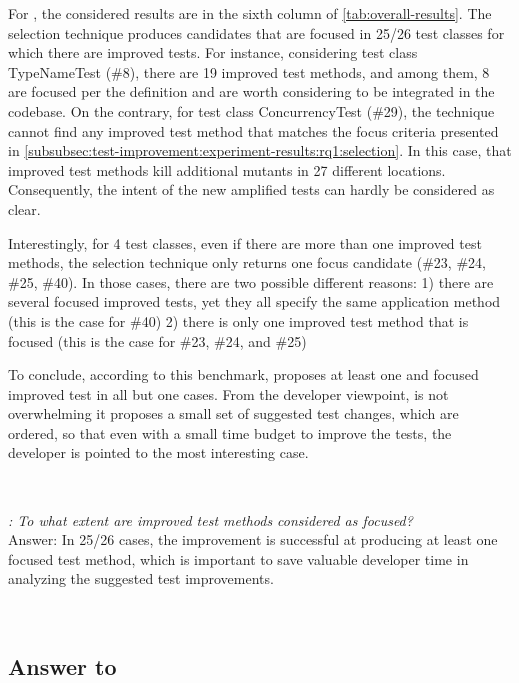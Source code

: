 For \rqcandidates{}, the considered results are in the sixth column of \autoref{tab:overall-results}.
The selection technique produces candidates that are focused in 25/26 test classes for which there are improved tests.
For instance, considering test class TypeNameTest (\#8), there are 19 improved test methods, and among them, 8 are focused per the definition and are worth considering to be integrated in the codebase.
On the contrary, for test class ConcurrencyTest (\#29), the technique cannot find any improved test method that matches the focus criteria presented in \autoref{subsubsec:test-improvement:experiment-results:rq1:selection}. 
In this case, that improved test methods kill additional mutants in 27 different locations. 
Consequently, the intent of the new amplified tests can  hardly be considered as clear.

Interestingly, for 4 test classes, even if there are more than one improved test methods, the selection technique only returns one focus candidate (\#23, \#24, \#25, \#40). 
In those cases, there are two possible different reasons:
1) there are several focused improved tests, yet they all specify the same application method (this is the case for \#40)
2) there is only one improved test method that is focused (this is the case for \#23, \#24, and \#25)

To conclude, according to this benchmark, \dspot proposes at least one and focused improved test in all but one cases. 
From the developer viewpoint, \dspot is not overwhelming it proposes a small set of suggested test changes, which are ordered, so that even with a small time budget to improve the tests, the developer is pointed to the most interesting case.

~\\
\begin{mdframed}
	\textit{\rqcandidates{}: To what extent are improved test methods considered as focused?}\\
	Answer: In 25/26 cases, the improvement is successful at producing at least one focused test method, which is important to save valuable developer time in analyzing the suggested test improvements.
\end{mdframed}
~\\

\subsection{Answer to \rqeffectiveness}
\label{subsec:test-improvement:experiment-results:rq3}

